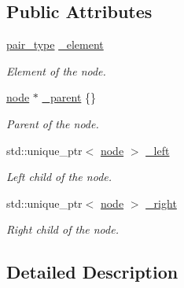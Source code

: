 \subsection*{Public Attributes}
\begin{DoxyCompactItemize}
\item 
\mbox{\label{structbst_1_1node_ad85af5ac81f4ac83c546c16913887845}} 
\hyperlink{classbst_a7b11cca2a3b4394915600194f741ab16}{pair\+\_\+type} \hyperlink{structbst_1_1node_ad85af5ac81f4ac83c546c16913887845}{\+\_\+element}
\begin{DoxyCompactList}\small\item\em Element of the node. \end{DoxyCompactList}\item 
\mbox{\label{structbst_1_1node_a96c0f20c8efbf9e17ec29c150acdc0ed}} 
\hyperlink{structbst_1_1node}{node} $\ast$ \hyperlink{structbst_1_1node_a96c0f20c8efbf9e17ec29c150acdc0ed}{\+\_\+parent} \{\}
\begin{DoxyCompactList}\small\item\em Parent of the node. \end{DoxyCompactList}\item 
\mbox{\label{structbst_1_1node_a72462a1f1920ab43215629445b3fc106}} 
std\+::unique\+\_\+ptr$<$ \hyperlink{structbst_1_1node}{node} $>$ \hyperlink{structbst_1_1node_a72462a1f1920ab43215629445b3fc106}{\+\_\+left}
\begin{DoxyCompactList}\small\item\em Left child of the node. \end{DoxyCompactList}\item 
\mbox{\label{structbst_1_1node_ac891c352566694de0faf0ee19b392f91}} 
std\+::unique\+\_\+ptr$<$ \hyperlink{structbst_1_1node}{node} $>$ \hyperlink{structbst_1_1node_ac891c352566694de0faf0ee19b392f91}{\+\_\+right}
\begin{DoxyCompactList}\small\item\em Right child of the node. \end{DoxyCompactList}\end{DoxyCompactItemize}


\subsection{Detailed Description}
